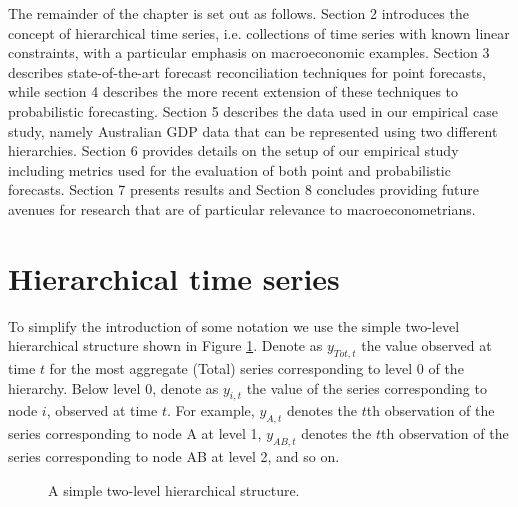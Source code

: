 \documentclass[graybox]{svmult}
\begin{document}
The remainder of the chapter is set out as follows.  Section 2 introduces the concept of hierarchical time series, i.e. collections of time series with known linear constraints, with a particular emphasis on macroeconomic examples. Section 3 describes state-of-the-art forecast reconciliation techniques for point forecasts, while section 4 describes the more recent extension of these techniques to probabilistic forecasting.  Section 5 describes the data used in our empirical case study, namely Australian GDP data that can be represented using two different hierarchies.  Section 6 provides details on the setup of our empirical study including metrics used for the evaluation of both point and probabilistic forecasts.  Section 7 presents results and Section 8 concludes providing future avenues for research that are of particular relevance to macroeconometrians.

\section{Hierarchical time series}\label{sec:Hier ts}

To simplify the introduction of some notation we use the simple two-level hierarchical structure shown in Figure \ref{fig:simple tree}. Denote as $y_{Tot,t}$ the value observed at time $t$ for the most aggregate (Total) series  corresponding to level 0 of the hierarchy. Below level 0, denote as $y_{i,t}$ the value of the series corresponding to node $i$, observed at time $t$. For example, $y_{A,t}$ denotes the $t$th observation of the series corresponding to node A at level 1, $y_{AB,t}$ denotes the $t$th observation of the series corresponding to node AB at level 2, and so on.

\begin{figure}[!hbt]  \center
  \caption{A simple two-level hierarchical structure.}
  \label{fig:simple tree}
\end{figure}
\end{document}
